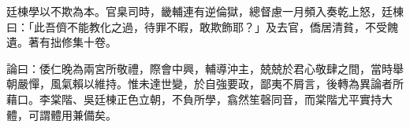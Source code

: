 \begin{pinyinscope}
廷棟學以不欺為本。官臬司時，畿輔連有逆倫獄，總督慮一月頻入奏乾上怒，廷棟曰：「此吾儕不能教化之過，待罪不暇，敢欺飾耶？」及去官，僑居清貧，不受餽遺。著有拙修集十卷。

論曰：倭仁晚為兩宮所敬禮，際會中興，輔導沖主，兢兢於君心敬肆之間，當時舉朝嚴憚，風氣賴以維持。惟未達世變，於自強要政，鄙夷不屑言，後轉為異論者所藉口。李棠階、吳廷棟正色立朝，不負所學，翕然笙磬同音，而棠階尤平實持大體，可謂體用兼備矣。


\end{pinyinscope}